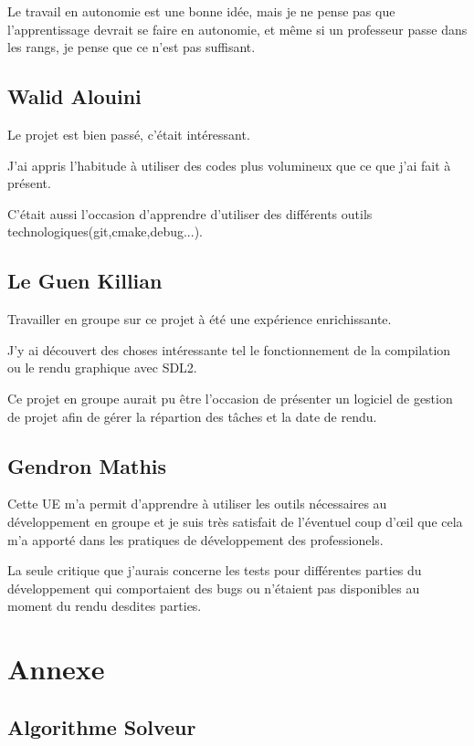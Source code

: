 \documentclass[12pt]{article}
\begin{document}
Le travail en autonomie est une bonne idée, mais je ne pense pas que l'apprentissage devrait se faire en autonomie, et même si un professeur passe dans les rangs, je pense que ce n'est pas suffisant.
\subsection{Walid Alouini}
Le projet est bien passé, c'était intéressant.

J'ai appris l'habitude à utiliser des codes plus volumineux que ce que j'ai fait à présent.

C'était aussi l'occasion d'apprendre d'utiliser des différents outils technologiques(git,cmake,debug...).
\subsection{Le Guen Killian}

Travailler en groupe sur ce projet à été une expérience enrichissante.

J'y ai découvert des choses intéressante tel le fonctionnement de la compilation ou le rendu graphique avec SDL2.

Ce projet en groupe aurait pu être l'occasion de présenter un logiciel de gestion de projet afin de gérer la répartion des tâches et la date de rendu.

\subsection{Gendron Mathis}

Cette UE m'a permit d'apprendre à utiliser les outils nécessaires au développement en groupe
et je suis très satisfait de l'éventuel coup d'\oe{}il que cela m'a apporté dans les pratiques
de développement des professionels.

La seule critique que j'aurais concerne les tests pour différentes parties du développement
qui comportaient des bugs ou n'étaient pas disponibles au moment du rendu desdites parties.





\section{Annexe}
\subsection{Algorithme Solveur}
\label{algosolv}

\end{document}
